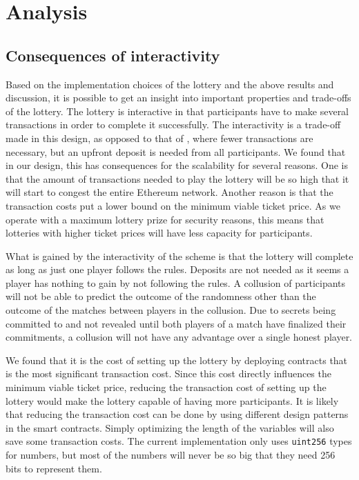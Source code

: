 \section{Analysis}
\label{sec:analysis}

\subsection{Consequences of interactivity}

Based on the implementation choices of the lottery and the above results and discussion, it is possible to get an insight into important properties and trade-offs of the lottery. The lottery is interactive in that participants have to make several transactions in order to complete it successfully. The interactivity is a trade-off made in this design, as opposed to that of \cite{andrychowicz_secure_2014,bentov_how_2014}, where fewer transactions are necessary, but an upfront deposit is needed from all participants. We found that in our design, this has consequences for the scalability for several reasons. One is that the amount of transactions needed to play the lottery will be so high that it will start to congest the entire Ethereum network. Another reason is that the transaction costs put a lower bound on the minimum viable ticket price. As we operate with a maximum lottery prize for security reasons, this means that lotteries with higher ticket prices will have less capacity for participants.

What is gained by the interactivity of the scheme is that the lottery will complete as long as just one player follows the rules. Deposits are not needed as it seems a player has nothing to gain by not following the rules. A collusion of participants will not be able to predict the outcome of the randomness other than the outcome of the matches between players in the collusion. Due to secrets being committed to and not revealed until both players of a match have finalized their commitments, a collusion will not have any advantage over a single honest player.

We found that it is the cost of setting up the lottery by deploying contracts that is the most significant transaction cost. Since this cost directly influences the minimum viable ticket price, reducing the transaction cost of setting up the lottery would make the lottery capable of having more participants. It is likely that reducing the transaction cost can be done by using different design patterns in the smart contracts. Simply optimizing the length of the variables will also save some transaction costs. The current implementation only uses \texttt{uint256} types for numbers, but most of the numbers will never be so big that they need 256 bits to represent them.

